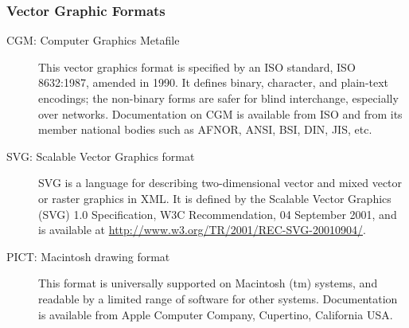 \subsubsection[{Vector Graphic Formats}]{Vector Graphic Formats}\label{FTGRAVGF}\begin{description}

\item[{CGM: Computer Graphics Metafile}]This vector graphics format is specified by an ISO standard, ISO 8632:1987, amended in 1990. It defines binary, character, and plain-text encodings; the non-binary forms are safer for blind interchange, especially over networks. Documentation on CGM is available from ISO and from its member national bodies such as AFNOR, ANSI, BSI, DIN, JIS, etc. 
\item[{SVG: Scalable Vector Graphics format}]SVG is a language for describing two-dimensional vector and mixed vector or raster graphics in XML. It is defined by the Scalable Vector Graphics (SVG) 1.0 Specification, W3C Recommendation, 04 September 2001, and is available at \url{http://www.w3.org/TR/2001/REC-SVG-20010904/}.
\item[{PICT: Macintosh drawing format}]This format is universally supported on Macintosh (tm) systems, and readable by a limited range of software for other systems. Documentation is available from Apple Computer Company, Cupertino, California USA. 
\end{description} 
